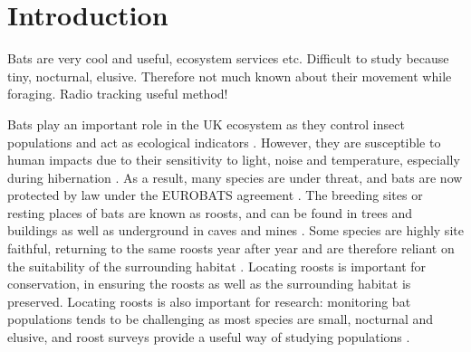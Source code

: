 \section{Introduction}

Bats are very cool and useful, ecosystem services etc.
Difficult to study because tiny, nocturnal, elusive.
Therefore not much known about their movement while foraging.
Radio tracking useful method!



Bats play an important role in the UK ecosystem as they control insect
populations \cite{Kunz2011} and act as ecological indicators \cite{Jones2009}.
However, they are susceptible to human impacts due to their sensitivity to
light, noise and temperature, especially during hibernation \cite{Jones2009}. As
a result, many species are under threat, and bats are now protected by law under
the EUROBATS agreement \cite{Eurobats}. The breeding sites or resting places of
bats are known as roosts, and can be found in trees and buildings as well as
underground in caves and mines \cite{Eurobats}. Some species are highly site
faithful, returning to the same roosts year after year and are therefore reliant
on the suitability of the surrounding habitat \cite{Lewis1995}. Locating roosts
is important for conservation, in ensuring the roosts as well as the surrounding
habitat is preserved. Locating roosts is also important for research: monitoring
bat populations tends to be challenging as most species are small, nocturnal and
elusive, and roost surveys provide a useful way of studying populations
\cite{Flaquer2007}.
